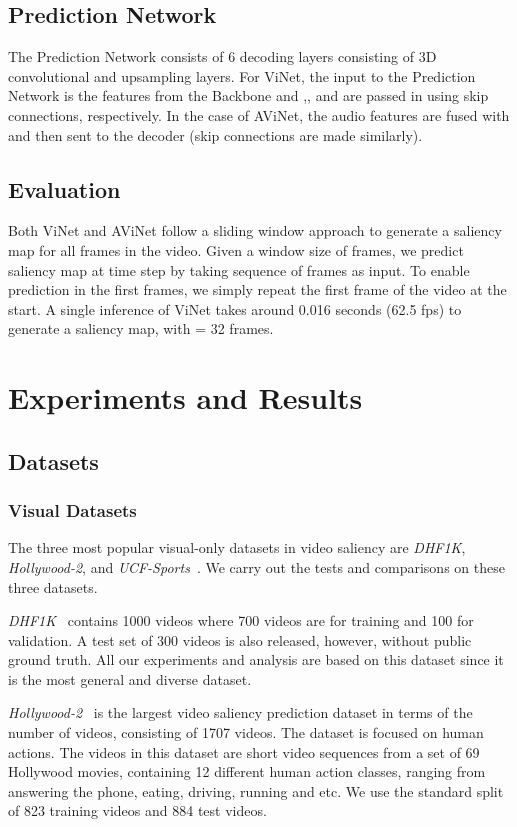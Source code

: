\documentclass[letterpaper, 10 pt, conference]{ieeeconf}  \usepackage{times}
\begin{document}
\subsection{Prediction Network}

The Prediction Network consists of 6 decoding layers consisting of 3D convolutional and upsampling layers. For ViNet, the input to the Prediction Network is the  features from the Backbone and ,, and  are passed in using skip connections, respectively. In the case of AViNet, the audio features are fused with  and then sent to the decoder (skip connections are made similarly). 


\subsection{Evaluation}
Both ViNet and AViNet follow a sliding window approach to generate a saliency map for all frames in the video. Given a window size of  frames, we predict saliency map  at time step  by taking  sequence of frames as input. To enable prediction in the first  frames, we simply repeat the first frame of the video at the start. A single inference of ViNet takes around 0.016 seconds (62.5 fps) to generate a saliency map, with  = 32 frames.




\section{Experiments and Results}
\subsection{Datasets}
\subsubsection{Visual Datasets}
The three most popular visual-only datasets in video saliency are \emph{DHF1K}, \emph{Hollywood-2}, and \emph{UCF-Sports}~\cite{rodriguez2008action}. We carry out the tests and comparisons on these three datasets. 

\emph{DHF1K}~\cite{wang2018revisiting} contains 1000 videos where 700 videos are for training and 100 for validation. A test set of 300 videos is also released, however, without public ground truth. All our experiments and analysis are based on this dataset since it is the most general and diverse dataset.

\emph{Hollywood-2}~\cite{marszalek2009actions} is the largest video saliency prediction dataset in terms of the number of videos, consisting of 1707 videos. The dataset is focused on human actions. The videos in this dataset are short video sequences from a set of 69 Hollywood movies, containing 12 different human action classes, ranging from answering the phone, eating, driving, running and etc. We use the standard split of 823  training videos and 884 test videos.
\end{document}
